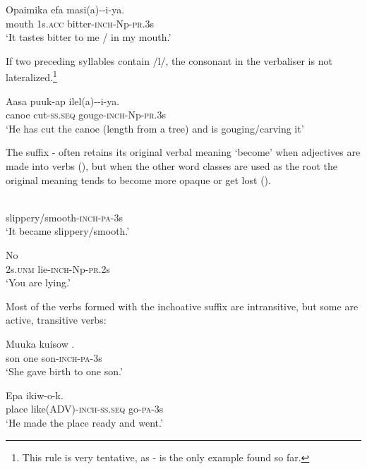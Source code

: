 \ea%
\label{ex:x199}
\gll Opaimika efa masi(a)--i-ya. \\
mouth 1s.\textsc{acc} bitter-\textsc{inch}-Np-\textsc{pr}.3s \\
\glt`It tastes bitter to me / in my mouth.'
\z

If two preceding syllables contain /l/, the consonant in the verbaliser is not lateralized.\footnote{This rule is very tentative, as - is the only example found so far.}

\ea%
\label{ex:x200}
\gll Aasa puuk-ap ilel(a)--i-ya. \\
canoe cut-\textsc{ss}.\textsc{seq} gouge-\textsc{inch}-Np-\textsc{pr}.3s \\
\glt`He has cut the canoe (length from a tree) and is gouging/carving it' 
\z

The suffix - often retains its original verbal meaning `become' when adjectives are made into verbs (), but when the other word classes are used as the root the original meaning tends to become more opaque or get lost (). 

\ea%
\label{ex:x201}
\gll {} \\
slippery/smooth-\textsc{inch}-\textsc{pa}-3s \\
\glt`It became slippery/smooth.' 
\z

\ea%
\label{ex:x202}
\gll No  \\
2s.\textsc{unm} lie-\textsc{inch}-Np-\textsc{pr}.2s \\
\glt`You are lying.' 
\z

Most of the verbs formed with the inchoative suffix are intransitive, but some are active, transitive verbs:

\ea%
\label{ex:x203}
\gll Muuka kuisow . \\
son one son-\textsc{inch}-\textsc{pa}-3s \\
\glt`She gave birth to one son.'
\z

\ea%
\label{ex:x204}
\gll Epa  ikiw-o-k. \\
place like(ADV)-\textsc{inch}-\textsc{ss}.\textsc{seq} go-\textsc{pa}-3s \\
\glt`He made the place ready and went.'
\z

